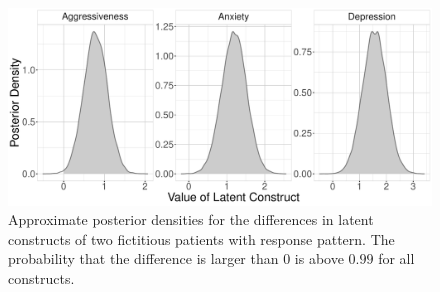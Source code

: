 \documentclass[a4paper,usenames,dvipsnames]{article}
\begin{document}
\begin{figure}[!ht]
	\includegraphics[width=\textwidth]{figures/twoPatientsDiffDensity.pdf}
	\caption{Approximate posterior densities for the differences in latent constructs of two fictitious patients with response pattern. The probability that the difference is larger than 0 is above $0.99$ for all constructs.}
	\label{fig:ExamplePosteriorDiff}
\end{figure}
\end{document}
